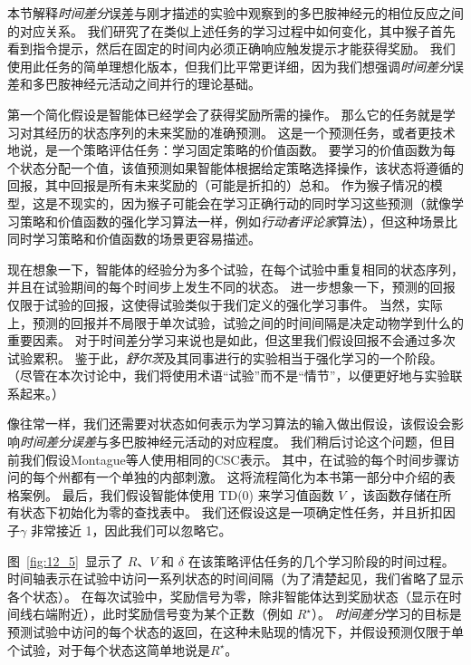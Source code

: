 本节解释\textit{时间差分}误差与刚才描述的实验中观察到的多巴胺神经元的相位反应之间的对应关系。
我们研究了在类似上述任务的学习过程中如何变化，其中猴子首先看到指令提示，然后在固定的时间内必须正确响应触发提示才能获得奖励。
我们使用此任务的简单理想化版本，但我们比平常更详细，因为我们想强调\textit{时间差分}误差和多巴胺神经元活动之间并行的理论基础。


第一个简化假设是智能体已经学会了获得奖励所需的操作。
那么它的任务就是学习对其经历的状态序列的未来奖励的准确预测。
这是一个预测任务，或者更技术地说，是一个策略评估任务：学习固定策略的价值函数。
要学习的价值函数为每个状态分配一个值，该值预测如果智能体根据给定策略选择操作，该状态将遵循的回报，其中回报是所有未来奖励的（可能是折扣的）总和。
作为猴子情况的模型，这是不现实的，因为猴子可能会在学习正确行动的同时学习这些预测（就像学习策略和价值函数的强化学习算法一样，例如\textit{行动者}\textit{评论家}算法），但这种场景比同时学习策略和价值函数的场景更容易描述。


现在想象一下，智能体的经验分为多个试验，在每个试验中重复相同的状态序列，并且在试验期间的每个时间步上发生不同的状态。
进一步想象一下，预测的回报仅限于试验的回报，这使得试验类似于我们定义的强化学习事件。
当然，实际上，预测的回报并不局限于单次试验，试验之间的时间间隔是决定动物学到什么的重要因素。
对于时间差分学习来说也是如此，但这里我们假设回报不会通过多次试验累积。
鉴于此，\textit{舒尔茨}及其同事进行的实验相当于强化学习的一个阶段。
（尽管在本次讨论中，我们将使用术语“试验”而不是“情节”，以便更好地与实验联系起来。）


像往常一样，我们还需要对状态如何表示为学习算法的输入做出假设，该假设会影响\textit{时间差分误差}与多巴胺神经元活动的对应程度。
我们稍后讨论这个问题，但目前我们假设Montague等人使用相同的CSC表示\cite{montague1996framework}。
其中，在试验的每个时间步骤访问的每个州都有一个单独的内部刺激。
这将流程简化为本书第一部分中介绍的表格案例。
最后，我们假设智能体使用 TD(0) 来学习值函数 $V$ ，该函数存储在所有状态下初始化为零的查找表中。
我们还假设这是一项确定性任务，并且折扣因子$\gamma$ 非常接近 1，因此我们可以忽略它。


图~\ref{fig:12_5}~显示了 $R$、$V$ 和 $\delta$ 在该策略评估任务的几个学习阶段的时间过程。 
时间轴表示在试验中访问一系列状态的时间间隔（为了清楚起见，我们省略了显示各个状态）。
在每次试验中，奖励信号为零，除非智能体达到奖励状态（显示在时间线右端附近），此时奖励信号变为某个正数（例如 $R^{\star}$）。
\textit{时间差分}学习的目标是预测试验中访问的每个状态的返回，在这种未贴现的情况下，并假设预测仅限于单个试验，对于每个状态这简单地说是$R^{\star}$。


